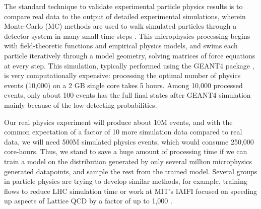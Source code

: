 The standard technique to validate experimental particle physics results is to compare real data to the output of detailed experimental simulations, wherein Monte-Carlo (MC) methods are used to walk simulated particles through a detector system in many small time steps \cite{Jo2015CrossDistributions} \cite{Zyla2020ReviewPhysics}. This microphysics processing begins with field-theoretic functions and empirical physics models, and swims each particle iteratively through a model geometry, solving matrices of force equations at every step. This simulation, typically performed using the GEANT4 package \cite{Agostinelli2003Geant4aToolkit}, is very computationally expensive: processing the optimal number of physics events (10,000) on a 2 GB single core takes 5 hours. Among 10,000 processed events, only about 100 events has the full final states after GEANT4 simulation mainly because of the low detecting probabilities.

Our real physics experiment will produce about 10M events, and with the common expectation of a factor of 10 more simulation data compared to real data, we will need 500M simulated physics events, which would consume 250,000 core-hours. Thus, we stand to save a huge amount of processing time if we can train a model on the distribution generated by only several million microphysics generated datapoints, and sample the rest from the trained model. Several groups in particle physics are trying to develop similar methods, for example, training flows to reduce LHC simulation time \cite{Weisser2021ThePhysics} or work at MIT's IAIFI focused on speeding up aspects of Lattice QCD by a factor of up to 1,000 \cite{Kanwar2020EquivariantTheory}.


